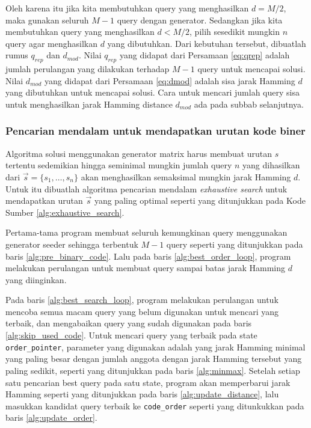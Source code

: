 Oleh karena itu jika kita membutuhkan query yang menghasilkan $d = M/2$, maka gunakan seluruh $M-1$ query dengan generator. Sedangkan jika kita membutuhkan query yang menghasilkan $d < M/2$, pilih sesedikit mungkin $n$ query agar menghasilkan $d$ yang dibutuhkan. Dari kebutuhan tersebut, dibuatlah rumus $q_{rep}$ dan $d_{mod}$. Nilai $q_{rep}$ yang didapat dari Persamaan \ref{eq:qrep} adalah jumlah perulangan yang dilakukan terhadap $M-1$ query untuk mencapai solusi. Nilai $d_{mod}$ yang didapat dari Persamaan \ref{eq:dmod} adalah sisa jarak Hamming $d$ yang dibutuhkan untuk mencapai solusi. Cara untuk mencari jumlah query sisa untuk menghasilkan jarak Hamming distance $d_{mod}$ ada pada subbab selanjutnya.

\subsubsection{Pencarian mendalam untuk mendapatkan urutan kode biner}

Algoritma solusi menggunakan generator matrix harus membuat urutan $s$ tertentu sedemikian hingga seminimal mungkin jumlah query $n$ yang dihasilkan dari $\vec{s} = \{s_1, \ldots, s_n\}$ akan menghasilkan semaksimal mungkin jarak Hamming $d$. Untuk itu dibuatlah algoritma pencarian mendalam \textit{exhaustive search} untuk mendapatkan urutan $\vec{s}$ yang paling optimal seperti yang ditunjukkan pada Kode Sumber \ref{alg:exhaustive_search}.

Pertama-tama program membuat seluruh kemungkinan query menggunakan generator seeder sehingga terbentuk $M-1$ query seperti yang ditunjukkan pada baris \ref{alg:pre_binary_code}. Lalu pada baris \ref{alg:best_order_loop}, program melakukan perulangan untuk membuat query sampai batas jarak Hamming $d$ yang diinginkan. 

Pada baris \ref{alg:best_search_loop}, program melakukan perulangan untuk mencoba semua macam query yang belum digunakan untuk mencari yang terbaik, dan mengabaikan query yang sudah digunakan pada baris \ref{alg:skip_used_code}. Untuk mencari query yang terbaik pada state \texttt{order\_pointer}, parameter yang digunakan adalah yang jarak Hamming minimal yang paling besar dengan jumlah anggota dengan jarak Hamming tersebut yang paling sedikit, seperti yang ditunjukkan pada baris \ref{alg:minmax}. Setelah setiap satu pencarian best query pada satu state, program akan memperbarui jarak Hamming seperti yang ditunjukkan pada baris \ref{alg:update_distance}, lalu masukkan kandidat query terbaik ke \texttt{code\_order} seperti yang ditunkukkan pada baris \ref{alg:update_order}.

